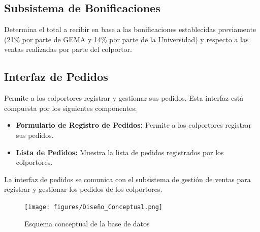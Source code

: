 \documentclass[runningheads]{llncs}
\begin{document}
            \subsection*{Subsistema de Bonificaciones}
                Determina el total a recibir en base a las bonificaciones establecidas previamente (21\% por parte de GEMA y 14\% por parte de la Universidad) y respecto a las ventas realizadas por parte del colportor.
            \subsection*{Interfaz de Pedidos}
                Permite a los colportores registrar y gestionar sus pedidos. Esta interfaz está compuesta por los siguientes componentes:
                \begin{itemize}
                    \item \textbf{Formulario de Registro de Pedidos:}  Permite a los colportores registrar sus pedidos.
                    \item \textbf{Lista de Pedidos:} Muestra la lista de pedidos registrados por los colportores.
                \end{itemize}
                La interfaz de pedidos se comunica con el subsistema de gestión de ventas para registrar y gestionar los pedidos de los colportores.
                \begin{figure}[H]
                    \centering\captionsetup{width=0.8\textwidth}
                    \texttt{[image: figures/Diseño\_Conceptual.png]}
                    \caption{Esquema conceptual de la base de datos} \label{fig5}
                \end{figure}
\end{document}
